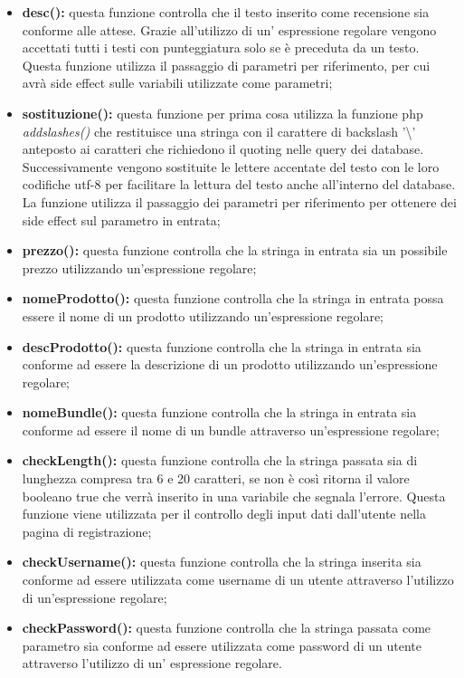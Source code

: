 \begin{itemize}
    \item \textbf{desc():} questa funzione controlla che il testo inserito come recensione sia conforme alle attese. Grazie all'utilizzo di un' espressione regolare vengono accettati tutti i testi con punteggiatura solo se è preceduta da un testo.\newline
    Questa funzione utilizza il passaggio di parametri per riferimento, per cui avrà side effect sulle variabili utilizzate come parametri;
    
    
    \item \textbf{sostituzione():} questa funzione per prima cosa utilizza la funzione php \emph{addslashes()} che restituisce una stringa con il carattere di backslash '\textbackslash' anteposto ai caratteri che richiedono il quoting nelle query dei database.
    Successivamente vengono sostituite le lettere accentate del testo con le loro codifiche utf-8 per facilitare la lettura del testo anche all'interno del database.
    La funzione utilizza il passaggio dei parametri per riferimento per ottenere dei side effect sul parametro in entrata;
    
    \item \textbf{prezzo():} questa funzione controlla che la stringa in entrata sia un possibile prezzo utilizzando un'espressione regolare;
    
    \item \textbf{nomeProdotto():} questa funzione controlla che la stringa in entrata possa essere il nome di un prodotto utilizzando un'espressione regolare;
    
    \item \textbf{descProdotto():} questa funzione controlla che la stringa in entrata sia conforme ad essere la descrizione di un prodotto utilizzando un'espressione regolare;
    
    \item \textbf{nomeBundle():} questa funzione controlla che la stringa in entrata sia conforme ad essere il nome di un bundle attraverso un'espressione regolare;
    
    \item \textbf{checkLength():} questa funzione controlla che la stringa passata sia di lunghezza compresa tra 6 e 20 caratteri,
    se non è così ritorna il valore booleano true che verrà inserito in una variabile che segnala l'errore.
    Questa funzione viene utilizzata per il controllo degli input dati dall'utente nella pagina di registrazione;
    
    \item \textbf{checkUsername():} questa funzione controlla che la stringa inserita sia conforme ad essere utilizzata come username di un utente attraverso l'utilizzo di un'espressione regolare;

   \item \textbf{checkPassword():} questa funzione controlla che la stringa passata come parametro sia conforme ad essere utilizzata come password di un utente attraverso l'utilizzo di un' espressione regolare.

\end{itemize}

